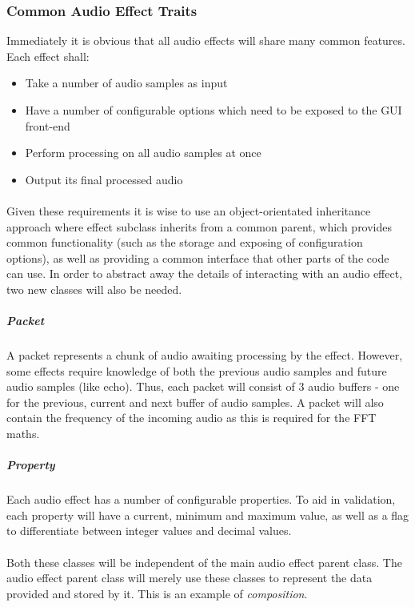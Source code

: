 \subsubsection{Common Audio Effect Traits}
Immediately it is obvious that all audio effects will share many common features. Each effect shall:
\begin{itemize}
	\item Take a number of audio samples as input
	\item Have a number of configurable options which need to be exposed to the GUI front-end
	\item Perform processing on all audio samples at once
	\item Output its final processed audio
\end{itemize}

\paragraph{}
Given these requirements it is wise to use an object-orientated inheritance approach where effect subclass inherits from a common parent, which provides common functionality (such as the storage and exposing of configuration options), as well as providing a common interface that other parts of the code can use. In order to abstract away the details of interacting with an audio effect, two new classes will also be needed.

\subparagraph{Packet} A packet represents a chunk of audio awaiting processing by the effect. However, some effects require knowledge of both the previous audio samples and future audio samples (like echo). Thus, each packet will consist of 3 audio buffers - one for the previous, current and next buffer of audio samples. A packet will also contain the frequency of the incoming audio as this is required for the FFT maths.

\subparagraph{Property} Each audio effect has a number of configurable properties. To aid in validation, each property will have a current,  minimum and maximum value, as well as a flag to differentiate between integer values and decimal values.

\paragraph{}
Both these classes will be independent of the main audio effect parent class. The audio effect parent class will merely use these classes to represent the data provided and stored by it. This is an example of {\it composition}.

